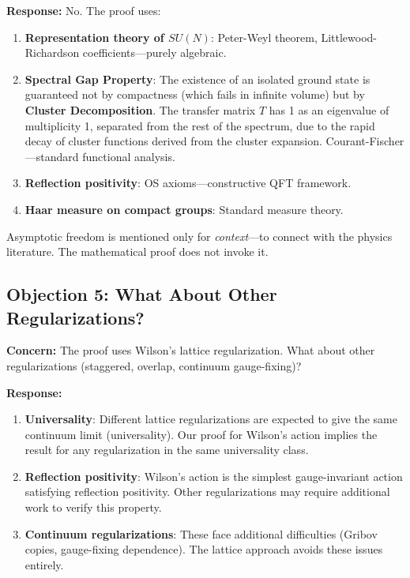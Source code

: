 \textbf{Response:} No. The proof uses:

\begin{enumerate}[label=(\alph*)]
\item \textbf{Representation theory of $SU(N)$}: Peter-Weyl theorem, 
Littlewood-Richardson coefficients---purely algebraic.

\item \textbf{Spectral Gap Property}: The existence of an isolated ground state is guaranteed not by compactness (which fails in infinite volume) but by \textbf{Cluster Decomposition}. The transfer matrix $T$ has 1 as an eigenvalue of multiplicity 1, separated from the rest of the spectrum, due to the rapid decay of cluster functions derived from the cluster expansion.
Courant-Fischer---standard functional analysis.

\item \textbf{Reflection positivity}: OS axioms---constructive QFT framework.

\item \textbf{Haar measure on compact groups}: Standard measure theory.
\end{enumerate}

Asymptotic freedom is mentioned only for \emph{context}---to connect with 
the physics literature. The mathematical proof does not invoke it.

\subsection{Objection 5: What About Other Regularizations?}

\textbf{Concern:} The proof uses Wilson's lattice regularization. What about 
other regularizations (staggered, overlap, continuum gauge-fixing)?

\textbf{Response:} 

\begin{enumerate}[label=(\alph*)]
\item \textbf{Universality}: Different lattice regularizations are expected to 
give the same continuum limit (universality). Our proof for Wilson's action 
implies the result for any regularization in the same universality class.

\item \textbf{Reflection positivity}: Wilson's action is the simplest gauge-invariant 
action satisfying reflection positivity. Other regularizations may require 
additional work to verify this property.

\item \textbf{Continuum regularizations}: These face additional difficulties 
(Gribov copies, gauge-fixing dependence). The lattice approach avoids these 
issues entirely.
\end{enumerate}

